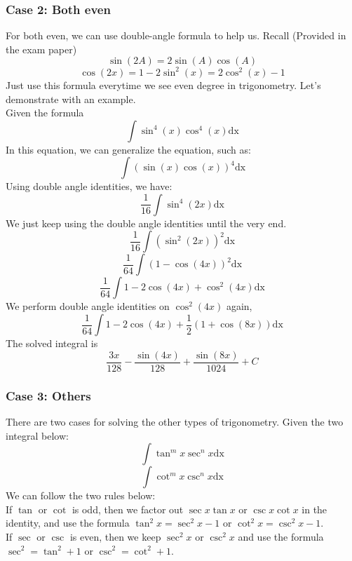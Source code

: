 \documentclass{article}
\begin{document}
\subsubsection{Case 2: Both even}
For both even, we can use double-angle formula to help us.
Recall (Provided in the exam paper)
\begin{equation}
  \sin(2A) = 2\sin(A)\cos(A)
\end{equation}
\begin{equation}
  \cos(2x) = 1-2\sin^2(x) = 2\cos^2(x)-1
\end{equation}
Just use this formula everytime we see even degree in trigonometry. Let's demonstrate with an example.\\
Given the formula
\begin{equation*}
  \int \sin^4(x) \cos^4(x) \text{dx}
\end{equation*}
In this equation, we can generalize the equation, such as:
\begin{equation*}
  \int (\sin(x) \cos(x))^4 \text{dx}
\end{equation*}
Using double angle identities, we have:
\begin{equation*}
  \frac{1}{16} \int \sin^4(2x) \text{dx}
\end{equation*}
We just keep using the double angle identities until the very end.
\begin{equation*}
  \frac{1}{16} \int (\sin^2(2x))^2 \text{dx}
\end{equation*}
\begin{equation*}
  \frac{1}{64} \int (1-\cos(4x))^2 \text{dx}
\end{equation*}
\begin{equation*}
  \frac{1}{64} \int 1-2\cos(4x)+\cos^2(4x) \text{dx}
\end{equation*}
We perform double angle identities on $\cos^2(4x)$ again,
\begin{equation*}
  \frac{1}{64} \int 1-2\cos(4x)+\frac{1}{2}(1+\cos(8x)) \text{dx}
\end{equation*}
The solved integral is
\begin{equation*}
  \frac{3x}{128}-\frac{\sin(4x)}{128}+\frac{\sin(8x)}{1024}+C 
\end{equation*}
\subsubsection{Case 3: Others}
There are two cases for solving the other types of trigonometry. Given the two integral below:
\begin{equation*}
  \int \tan^{m}x \sec^{n}x \text{dx}
\end{equation*}
\begin{equation*}
  \int \cot^{m}x \csc^{n}x \text{dx}
\end{equation*}
We can follow the two rules below: \\
If $\tan$ or $\cot$ is odd, then we factor out $\sec x\tan x$ or $\csc x \cot x$ in the identity, and use the formula $\tan^2 x = \sec^2 x-1$ or $\cot^2 x = \csc^2 x -1$. \\
If $\sec$ or $\csc$ is even, then we keep $\sec^2 x$ or $\csc^2 x$ and use the formula $\sec^2 = \tan^2+1$ or $\csc^2 = \cot^2+1$.
\end{document}
